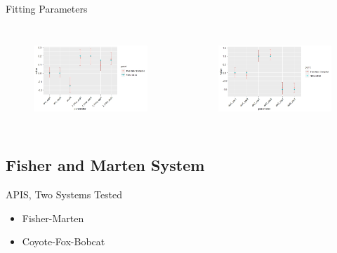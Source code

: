 \documentclass{beamer}
\begin{document}
\begin{frame}{Fitting Parameters}
		\begin{columns}
		\column{6cm}
		\begin{figure}[ht]
			\centering
			\includegraphics[scale=.4]{fig/Island_2spp/occu.jpeg}
			\label{occu}
		\end{figure}
		\column{6cm}
		\begin{figure}[ht]
			\centering
			\includegraphics[scale=.4]{fig/Island_2spp/det.jpeg}
			\label{det}
		\end{figure}
		
	\end{columns}
	
\end{frame}

\subsection{Fisher and Marten System}
\begin{frame}{APIS, Two Systems Tested}
	\begin{itemize}
		\item Fisher-Marten
		\item Coyote-Fox-Bobcat
	\end{itemize}
\end{frame}
\end{document}
